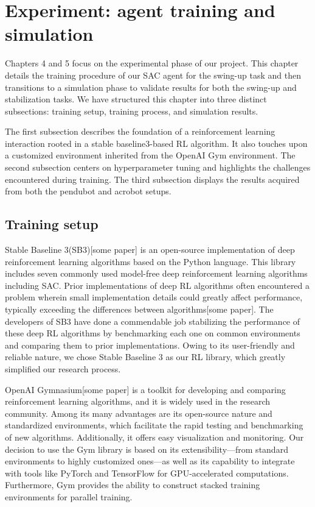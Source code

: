 \chapter{Experiment: agent training and simulation}
Chapters 4 and 5 focus on the experimental phase of our project. This chapter details the training procedure of our SAC agent for the swing-up task and then transitions to a simulation phase to validate results for both the swing-up and stabilization tasks. We have structured this chapter into three distinct subsections: training setup, training process, and simulation results.

The first subsection describes the foundation of a reinforcement learning interaction rooted in a stable baseline3-based RL algorithm. It also touches upon a customized environment inherited from the OpenAI Gym environment. The second subsection centers on hyperparameter tuning and highlights the challenges encountered during training. The third subsection displays the results acquired from both the pendubot and acrobot setups.

\section{Training setup}
Stable Baseline 3(SB3)[some paper] is an open-source implementation of deep reinforcement learning algorithms based on the Python language. This library includes seven commonly used model-free deep reinforcement learning algorithms including SAC. Prior implementations of deep RL algorithms often encountered a problem wherein small implementation details could greatly affect performance, typically exceeding the differences between algorithms[some paper]. The developers of SB3 have done a commendable job stabilizing the performance of these deep RL algorithms by benchmarking each one on common environments and comparing them to prior implementations. Owing to its user-friendly and reliable nature, we chose Stable Baseline 3 as our RL library, which greatly simplified our research process.

OpenAI Gymnasium[some paper] is a toolkit for developing and comparing reinforcement learning algorithms, and it is widely used in the research community. Among its many advantages are its open-source nature and standardized environments, which facilitate the rapid testing and benchmarking of new algorithms. Additionally, it offers easy visualization and monitoring. Our decision to use the Gym library is based on its extensibility—from standard environments to highly customized ones—as well as its capability to integrate with tools like PyTorch and TensorFlow for GPU-accelerated computations. Furthermore, Gym provides the ability to construct stacked training environments for parallel training.

